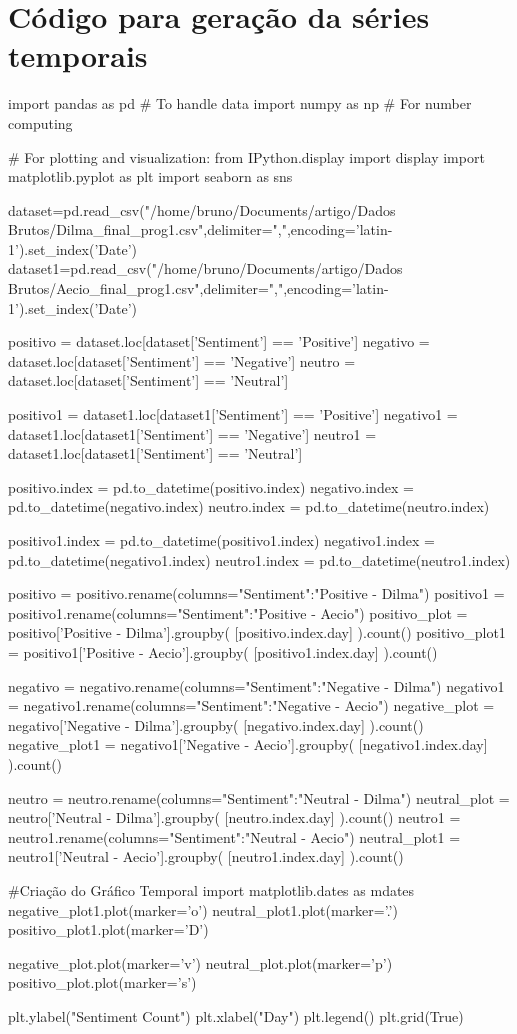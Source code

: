 \section{Código para geração da séries temporais}
\label{cod:time}
\begin{python}
import pandas as pd     # To handle data
import numpy as np      # For number computing

# For plotting and visualization:
from IPython.display import display
import matplotlib.pyplot as plt
import seaborn as sns

dataset=pd.read_csv("/home/bruno/Documents/artigo/Dados Brutos/Dilma_final_prog1.csv",delimiter=",",encoding='latin-1').set_index('Date')
dataset1=pd.read_csv("/home/bruno/Documents/artigo/Dados Brutos/Aecio_final_prog1.csv",delimiter=",",encoding='latin-1').set_index('Date')

positivo = dataset.loc[dataset['Sentiment'] == 'Positive']
negativo = dataset.loc[dataset['Sentiment'] == 'Negative']
neutro  = dataset.loc[dataset['Sentiment'] == 'Neutral']

positivo1 = dataset1.loc[dataset1['Sentiment'] == 'Positive']
negativo1 = dataset1.loc[dataset1['Sentiment'] == 'Negative']
neutro1  = dataset1.loc[dataset1['Sentiment'] == 'Neutral']

positivo.index = pd.to_datetime(positivo.index)
negativo.index = pd.to_datetime(negativo.index)
neutro.index = pd.to_datetime(neutro.index)


positivo1.index = pd.to_datetime(positivo1.index)
negativo1.index = pd.to_datetime(negativo1.index)
neutro1.index = pd.to_datetime(neutro1.index)

positivo = positivo.rename(columns={"Sentiment":"Positive - Dilma"})
positivo1 = positivo1.rename(columns={"Sentiment":"Positive - Aecio"})
positivo_plot = positivo['Positive - Dilma'].groupby( [positivo.index.day] ).count()
positivo_plot1 = positivo1['Positive - Aecio'].groupby( [positivo1.index.day] ).count()

negativo = negativo.rename(columns={"Sentiment":"Negative - Dilma"})
negativo1 = negativo1.rename(columns={"Sentiment":"Negative - Aecio"})
negative_plot = negativo['Negative - Dilma'].groupby( [negativo.index.day] ).count()
negative_plot1 = negativo1['Negative - Aecio'].groupby( [negativo1.index.day] ).count()

neutro = neutro.rename(columns={"Sentiment":"Neutral - Dilma"})
neutral_plot = neutro['Neutral - Dilma'].groupby( [neutro.index.day] ).count()
neutro1 = neutro1.rename(columns={"Sentiment":"Neutral - Aecio"})
neutral_plot1 = neutro1['Neutral - Aecio'].groupby( [neutro1.index.day] ).count()

#Criação do Gráfico Temporal
import matplotlib.dates as mdates
negative_plot1.plot(marker='o')
neutral_plot1.plot(marker='.')
positivo_plot1.plot(marker='D')


negative_plot.plot(marker='v')
neutral_plot.plot(marker='p')
positivo_plot.plot(marker='s')

plt.ylabel("Sentiment Count")
plt.xlabel("Day")
plt.legend()
plt.grid(True)

\end{python}